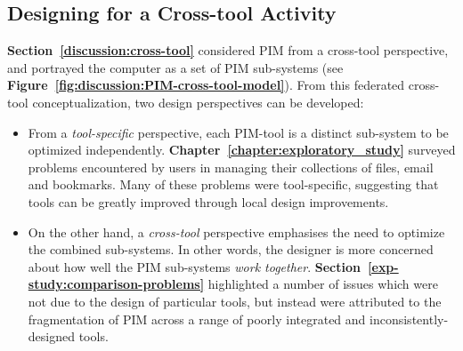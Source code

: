 \subsection{Designing for a Cross-tool Activity}
\label{discussion:methodology:cross-tool}
\textbf{Section~\ref{discussion:cross-tool}} considered PIM from a cross-tool perspective, and portrayed the computer as a set of PIM sub-systems (see \textbf{Figure~\ref{fig:discussion:PIM-cross-tool-model}}).  From this federated cross-tool conceptualization, two design perspectives can be developed:
\begin{itemize}

\item From a \textit{tool-specific} perspective, each PIM-tool is a distinct sub-system to be optimized independently.  \textbf{Chapter~\ref{chapter:exploratory_study}} surveyed problems encountered by users in managing their collections of files, email and bookmarks.  Many of these problems were tool-specific, suggesting that tools can be greatly improved through local design improvements.


\item On the other hand, a \textit{cross-tool} perspective emphasises the need to optimize the combined sub-systems. In other words, the designer is more concerned about how well the PIM sub-systems \textit{work together}.  \textbf{Section~\ref{exp-study:comparison-problems}} highlighted a number of issues which were not due to the design of particular tools, but instead were attributed to the fragmentation of PIM across a range of poorly integrated and inconsistently-designed tools.
\end{itemize}



